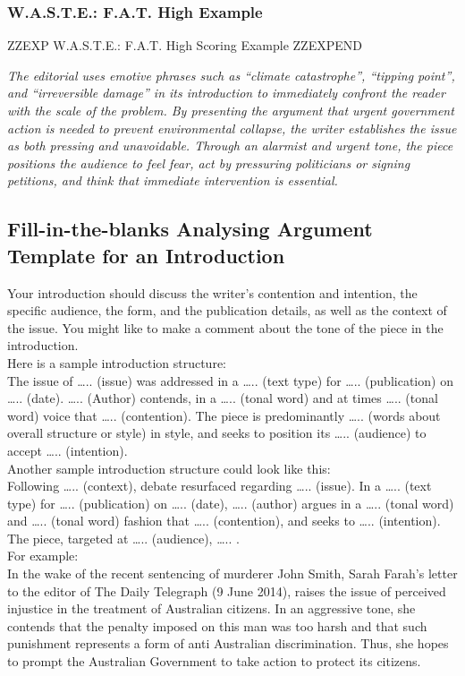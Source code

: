 \documentclass[a4paper]{article}
\begin{document}
\subsubsection{W.A.S.T.E.: F.A.T. High Example}


ZZEXP W.A.S.T.E.: F.A.T. High Scoring Example ZZEXPEND


\textit{The editorial uses emotive phrases such as “climate catastrophe”, “tipping point”, and “irreversible damage” in its introduction to immediately confront the reader with the scale of the problem. By presenting the argument that urgent government action is needed to prevent environmental collapse, the writer establishes the issue as both pressing and unavoidable. Through an alarmist and urgent tone, the piece positions the audience to feel fear, act by pressuring politicians or signing petitions, and think that immediate intervention is essential.}

\subsection{Fill-in-the-blanks Analysing Argument Template for an Introduction}

Your introduction should discuss the writer’s contention and intention, the specific audience, the
form, and the publication details, as well as the context of the issue. You might like to make a
comment about the tone of the piece in the introduction.\\

Here is a sample introduction structure:\\
The issue of ….. (issue) was addressed in a ….. (text type) for ….. (publication) on ….. (date). …..
(Author) contends, in a ….. (tonal word) and at times ….. (tonal word) voice that ….. (contention).
The piece is predominantly ….. (words about overall structure or style) in style, and seeks to
position its ….. (audience) to accept ….. (intention).\\

Another sample introduction structure could look like this:\\
Following ….. (context), debate resurfaced regarding ….. (issue). In a ….. (text type) for …..
(publication) on ….. (date), ….. (author) argues in a ….. (tonal word) and ….. (tonal word) fashion
that ….. (contention), and seeks to ….. (intention). The piece, targeted at ….. (audience), ….. .\\

For example:\\
In the wake of the recent sentencing of murderer John Smith, Sarah Farah’s letter to the editor of
The Daily Telegraph (9 June 2014), raises the issue of perceived injustice in the treatment of
Australian citizens. In an aggressive tone, she contends that the penalty imposed on this man was
too harsh and that such punishment represents a form of anti Australian discrimination. Thus, she
hopes to prompt the Australian Government to take action to protect its citizens.\\
\end{document}
